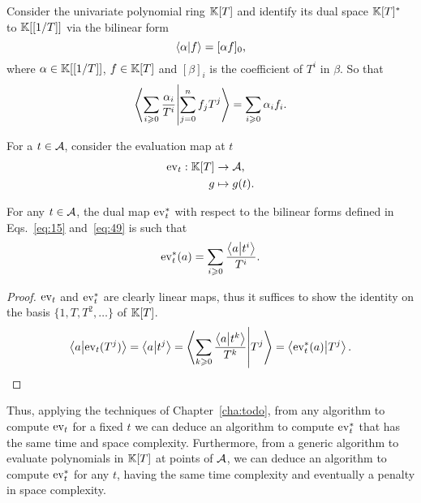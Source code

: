 Consider the univariate polynomial ring $\mathbb{K}[T]$ and identify its dual
space $\mathbb{K}[T]^\ast$ to $\mathbb{K}[[1/T]]$ via the bilinear form
\begin{equation}
  \label{eq:47}
  \left\langle \alpha \middle| f \right\rangle = [\alpha f]_0
  \text{,}
\end{equation}
where $\alpha\in\mathbb{K}[[1/T]]$, $f\in\mathbb{K}[T]$ and $[\beta]_i$ is the
coefficient of $T^i$ in $\beta$. So that
\begin{equation}
  \label{eq:48}
  \left\langle \sum_{i\geqslant0}\frac{\alpha_i}{T^i} \middle| \sum_{j=0}^nf_jT^j \right\rangle =
  \sum_{i\geqslant0}\alpha_if_i
  \text{.}
\end{equation}

For a $t\in\mathcal{A}$, consider the  evaluation map at $t$
\begin{equation}
  \label{eq:49}
  \begin{aligned}
    \operatorname{ev}_t : \mathbb{K}[T] &\rightarrow \mathcal{A}\text{,}\\
    g &\mapsto g(t)
    \text{.}
  \end{aligned}
\end{equation}

\begin{lemma}
  \label{th:shoup}
  For any $t\in\mathcal{A}$, the dual map $\operatorname{ev}_t^\ast$ with respect to
  the bilinear forms defined in Eqs.~\eqref{eq:15} and~\eqref{eq:49}
  is such that
  \begin{equation}
    \label{eq:50}
    \operatorname{ev}_t^\ast(a) = \sum_{i\geqslant0}\frac{\left\langle a \middle| t^i \right\rangle}{T^{i}}
    \text{.}
  \end{equation}
\end{lemma}
\begin{proof}
  $\operatorname{ev}_t$ and $\operatorname{ev}_t^\ast$ are clearly linear maps, thus it suffices
  to show the identity on the basis $\{1,T,T^2,\ldots\}$ of $\mathbb{K}[T]$.
  \begin{equation}
    \label{eq:51}
    \left\langle a \middle| \operatorname{ev}_t(T^j) \right\rangle =
    \left\langle a \middle| t^j \right\rangle =
    \left\langle \sum_{k\geqslant0}\frac{\left\langle a \middle| t^k \right\rangle}{T^k} \middle| T^j \right\rangle =
    \left\langle \operatorname{ev}_t^\ast(a) \middle| T^j \right\rangle
    \text{.}
  \end{equation}
\end{proof}

Thus, applying the techniques of Chapter~\ref{cha:todo}, from any
algorithm to compute $\operatorname{ev}_t$ for a fixed $t$ we can deduce an
algorithm to compute $\operatorname{ev}_t^\ast$ that has the same time and space
complexity. Furthermore, from a generic algorithm to evaluate
polynomials in $\mathbb{K}[T]$ at points of $\mathcal{A}$, we can deduce an
algorithm to compute $\operatorname{ev}_t^\ast$ for any $t$, having the same time
complexity and eventually a penalty in space complexity.

